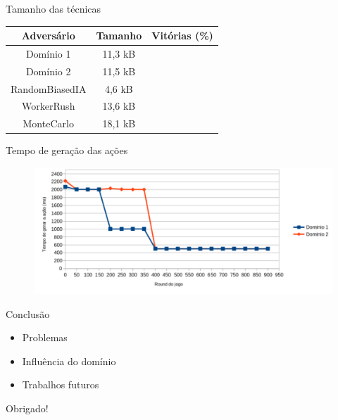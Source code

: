 \documentclass{beamer}
\begin{document}
\begin{frame}{Tamanho das técnicas}
	\begin{center}
		\begin{tabular}{|c|c|l|}
			\hline
			\textbf{Adversário} & \textbf{Tamanho} & Vitórias (\%) \\ \hline
			Domínio 1           & 11,3 kB          &               \\ \hline
			Domínio 2           & 11,5 kB          &               \\ \hline
			RandomBiasedIA      & 4,6 kB           &               \\ \hline
			WorkerRush          & 13,6 kB          &               \\ \hline
			MonteCarlo          & 18,1 kB          &               \\ \hline
		\end{tabular}
	\end{center}
\end{frame}
\begin{frame}{Tempo de geração das ações}
	\begin{figure}[here]
		\includegraphics[width=0.9\linewidth]{fig/graph.pdf}
	\end{figure}
\end{frame}

\begin{frame}{Conclusão}
	\begin{itemize}
		\item Problemas
		\item Influência do domínio
		\item Trabalhos futuros
	\end{itemize}
\end{frame}

	{
		\begin{frame}{}
			\centering
			Obrigado!
		\end{frame}
	}  
\end{document}

